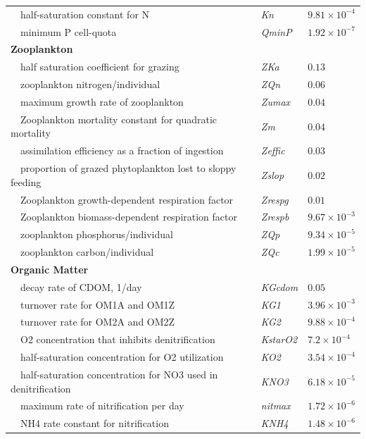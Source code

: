 \documentclass[letterpaper,12pt,oneside]{article}\usepackage[]{graphicx}\usepackage[]{color}
\begin{document}
\begin{table}[!tbp]
{\begin{center}
\begin{tabular}{lll}
~~half-saturation constant for N&\textit{Kn}&$9.81\times 10^{-4}$\tabularnewline
~~minimum P cell-quota&\textit{QminP}&$1.92\times 10^{-7}$\tabularnewline
\hline
{\bfseries Zooplankton}&&\tabularnewline
~~half saturation coefficient for grazing&\textit{ZKa}&$0.13$\tabularnewline
~~zooplankton nitrogen/individual&\textit{ZQn}&$0.06$\tabularnewline
~~maximum growth rate of zooplankton&\textit{Zumax}&$0.04$\tabularnewline
~~Zooplankton mortality constant for quadratic mortality&\textit{Zm}&$0.04$\tabularnewline
~~assimilation efficiency as a fraction of ingestion&\textit{Zeffic}&$0.03$\tabularnewline
~~proportion of grazed phytoplankton lost to sloppy feeding&\textit{Zslop}&$0.02$\tabularnewline
~~Zooplankton growth-dependent respiration factor&\textit{Zrespg}&$0.01$\tabularnewline
~~Zooplankton biomass-dependent respiration factor&\textit{Zrespb}&$9.67\times 10^{-3}$\tabularnewline
~~zooplankton phosphorus/individual&\textit{ZQp}&$9.34\times 10^{-5}$\tabularnewline
~~zooplankton carbon/individual&\textit{ZQc}&$1.99\times 10^{-5}$\tabularnewline
\hline
{\bfseries Organic Matter}&&\tabularnewline
~~decay rate of CDOM, 1/day&\textit{KGcdom}&$0.05$\tabularnewline
~~turnover rate for OM1A and OM1Z&\textit{KG1}&$3.96\times 10^{-3}$\tabularnewline
~~turnover rate for OM2A and OM2Z&\textit{KG2}&$9.88\times 10^{-4}$\tabularnewline
~~O2 concentration that inhibits denitrification&\textit{KstarO2}&$7.2\times 10^{-4}$\tabularnewline
~~half-saturation concentration for O2 utilization&\textit{KO2}&$3.54\times 10^{-4}$\tabularnewline
~~half-saturation concentration for NO3 used in denitrification&\textit{KNO3}&$6.18\times 10^{-5}$\tabularnewline
~~maximum rate of nitrification per day&\textit{nitmax}&$1.72\times 10^{-6}$\tabularnewline
~~NH4 rate constant for nitrification&\textit{KNH4}&$1.48\times 10^{-6}$\tabularnewline
\hline
\end{tabular}\end{center}}

\end{table}
\end{document}
